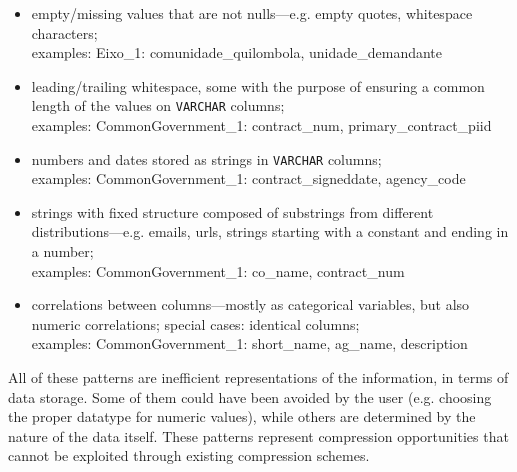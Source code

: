 \begin{itemize}

    \item empty/missing values that are not nulls---e.g. empty quotes, whitespace characters;\\ examples:
    Eixo\_1\footnotemark: comunidade\_quilombola, unidade\_demandante
    
    
    \item leading/trailing whitespace, some with the purpose of ensuring a common length of the values on \verb|VARCHAR| columns;\\ examples:
    CommonGovernment\_1\footnotemark: contract\_num, primary\_contract\_piid
    
    \item numbers and dates stored as strings in \verb|VARCHAR| columns;\\ examples:
    CommonGovernment\_1\footnotemark[\value{footnote}]: contract\_signeddate, agency\_code
    
    \item strings with fixed structure composed of substrings from different distributions---e.g. emails, urls, strings starting with a constant and ending in a number;\\ examples:
    CommonGovernment\_1\footnotemark[\value{footnote}]: co\_name, contract\_num
    
    \item correlations between columns---mostly as categorical variables, but also numeric correlations; special cases: identical columns;\\ examples:
    CommonGovernment\_1\footnotemark[\value{footnote}]: short\_name, ag\_name, description
    
\end{itemize}

All of these patterns are inefficient representations of the information, in terms of data storage. Some of them could have been avoided by the user (e.g. choosing the proper datatype for numeric values), while others are determined by the nature of the data itself. These patterns represent compression opportunities that cannot be exploited through existing compression schemes.
